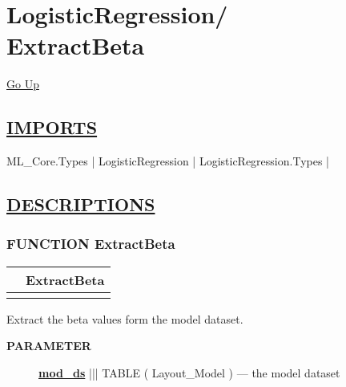\chapter*{\color{headfile}
{\large LogisticRegression\slash\hspace{0pt}}
 \\
ExtractBeta
}
\hypertarget{ecldoc:toc:LogisticRegression.ExtractBeta}{}
\hyperlink{ecldoc:toc:root/LogisticRegression}{Go Up}

\section*{\underline{\textsf{IMPORTS}}}
\begin{doublespace}
{\large
ML\_Core.Types |
LogisticRegression |
LogisticRegression.Types |
}
\end{doublespace}

\section*{\underline{\textsf{DESCRIPTIONS}}}
\subsection*{\textsf{\colorbox{headtoc}{\color{white} FUNCTION}
ExtractBeta}}

\hypertarget{ecldoc:logisticregression.extractbeta}{}

{\renewcommand{\arraystretch}{1.5}
\begin{tabularx}{\textwidth}{|>{\raggedright\arraybackslash}l|X|}
\hline
\hspace{0pt}\mytexttt{\color{red} } & \textbf{ExtractBeta} \\
\hline
\multicolumn{2}{|>{\raggedright\arraybackslash}X|}{\hspace{0pt}\mytexttt{\color{param} (DATASET(Core\_Types.Layout\_Model) mod\_ds)}} \\
\hline
\end{tabularx}
}

\par





Extract the beta values form the model dataset.






\par
\begin{description}
\item [\colorbox{tagtype}{\color{white} \textbf{\textsf{PARAMETER}}}] \textbf{\underline{mod\_ds}} ||| TABLE ( Layout\_Model ) --- the model dataset
\end{description}








